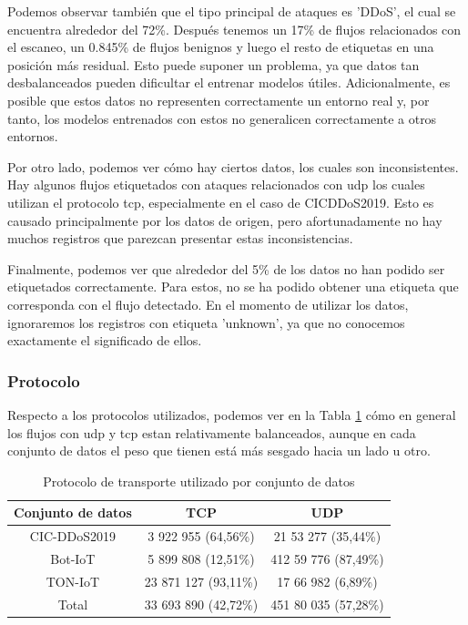 Podemos observar también que el tipo principal de ataques es 'DDoS', el cual se encuentra alrededor del 72\%. Después tenemos un 17\% de flujos relacionados con el escaneo, un 0.845\% de flujos benignos y luego el resto de etiquetas en una posición más residual. Esto puede suponer un problema, ya que datos tan desbalanceados pueden dificultar el entrenar modelos útiles. Adicionalmente, es posible que estos datos no representen correctamente un entorno real y, por tanto, los modelos entrenados con estos no generalicen correctamente a otros entornos.

Por otro lado, podemos ver cómo hay ciertos datos, los cuales son inconsistentes. Hay algunos flujos etiquetados con ataques relacionados con \acrshort{udp} los cuales utilizan el protocolo \acrshort{tcp}, especialmente en el caso de CIC\-DDoS2019. Esto es causado principalmente por los datos de origen, pero afortunadamente no hay muchos registros que parezcan presentar estas inconsistencias.

Finalmente, podemos ver que alrededor del 5\% de los datos no han podido ser etiquetados correctamente. Para estos, no se ha podido obtener una etiqueta que corresponda con el flujo detectado. En el momento de utilizar los datos, ignoraremos los registros con etiqueta 'unknown', ya que no conocemos exactamente el significado de ellos.

\subsubsection{Protocolo}

Respecto a los protocolos utilizados, podemos ver en la Tabla \ref{table:packetpincerasprotocols} cómo en general los flujos con \acrshort{udp} y \acrshort{tcp} estan relativamente balanceados, aunque en cada conjunto de datos el peso que tienen está más sesgado hacia un lado u otro.

\begin{table}[H]
    \centering
    \begin{tabular}{|c | c c |}
        \hline
        \textbf{Conjunto de datos} & \textbf{TCP}          & \textbf{UDP}         \\  \hline
        CIC-DDoS2019               &  3 922 955  (64,56\%) &  21 53 277 (35,44\%) \\
        Bot-IoT                    &  5 899 808  (12,51\%) & 412 59 776 (87,49\%) \\
        TON-IoT                    & 23 871 127  (93,11\%) &  17 66 982 (6,89\%)  \\
        Total                      & 33 693 890  (42,72\%) & 451 80 035 (57,28\%) \\
        \hline
    \end{tabular}
    \caption{Protocolo de transporte utilizado por conjunto de datos}
    \label{table:packetpincerasprotocols}
\end{table}

